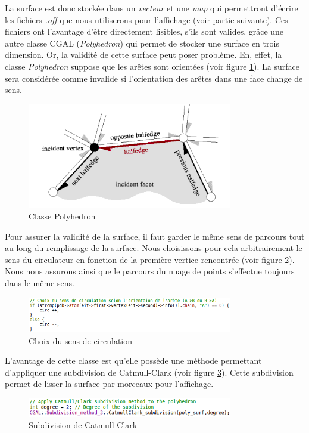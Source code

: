 La surface est donc stockée dans un \textit{vecteur} et une \textit{map} qui permettront
d'écrire les fichiers \textit{.off} que nous utiliserons pour l'affichage (voir partie
suivante). Ces fichiers ont l'avantage d'être directement lisibles, s'ils sont valides,
grâce une autre classe CGAL (\textit{Polyhedron}) qui permet de stocker
une surface en trois dimension.
Or, la validité de cette surface peut poser problème. En, effet, la classe \textit{Polyhedron}
suppose que les arêtes sont orientées (voir figure \ref{fig::polyheder}). La surface
sera considérée comme invalide si l'orientation des arêtes dans une face change de sens.
\begin{figure}[ht]
\centering
  \includegraphics[width=0.8\textwidth]{figures/polyheder.png}
  \caption{Classe Polyhedron}
  \label{fig::polyheder}
\end{figure}

Pour assurer la validité de la surface, il faut garder le même sens de parcours
tout au long du remplissage de la surface. Nous choisissons pour cela arbitrairement le sens
du circulateur en fonction de la première vertice rencontrée (voir figure \ref{fig::choix_sens}).
Nous nous assurons ainsi que le parcours du nuage de points s'effectue toujours dans le même
sens.
\begin{figure}[ht]
\centering
  \includegraphics[width=0.8\textwidth]{figures/choix_sens.png}
  \caption{Choix du sens de circulation}
  \label{fig::choix_sens}
\end{figure}



 L'avantage de cette classe est qu'elle possède
une méthode permettant d'appliquer une subdivision de Catmull-Clark (voir figure
\ref{fig::subdivide}). Cette subdivision permet de lisser la surface par morceaux
pour l'affichage.
\begin{figure}[ht]
\centering
  \includegraphics[width=0.8\textwidth]{figures/subdivide.png}
  \caption{Subdivision de Catmull-Clark}
  \label{fig::subdivide}
\end{figure}

